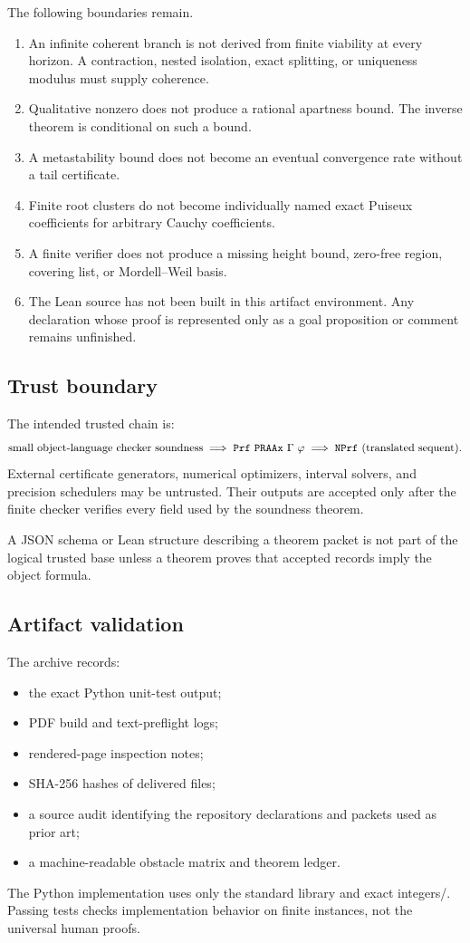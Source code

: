 The following boundaries remain.

\begin{enumerate}[label=\arabic*.]
\item An infinite coherent branch is not derived from finite viability at every horizon.  A contraction, nested isolation, exact splitting, or uniqueness modulus must supply coherence.
\item Qualitative nonzero does not produce a rational apartness bound.  The inverse theorem is conditional on such a bound.
\item A metastability bound does not become an eventual convergence rate without a tail certificate.
\item Finite root clusters do not become individually named exact Puiseux coefficients for arbitrary Cauchy coefficients.
\item A finite verifier does not produce a missing height bound, zero-free region, covering list, or Mordell--Weil basis.
\item The Lean source has not been built in this artifact environment.  Any declaration whose proof is represented only as a goal proposition or comment remains unfinished.
\end{enumerate}

\subsection{Trust boundary}

The intended trusted chain is:
\[
 \text{small object-language checker soundness}
 \;\Longrightarrow\;
 \texttt{Prf}\ \texttt{PRAAx}\ \Gamma\ \varphi
 \;\Longrightarrow\;
 \texttt{NPrf}\ (\text{translated sequent}).
\]
External certificate generators, numerical optimizers, interval solvers, and precision schedulers may be untrusted.  Their outputs are accepted only after the finite checker verifies every field used by the soundness theorem.

A JSON schema or Lean structure describing a theorem packet is not part of the logical trusted base unless a theorem proves that accepted records imply the object formula.

\subsection{Artifact validation}

The archive records:
\begin{itemize}
\item the exact Python unit-test output;
\item PDF build and text-preflight logs;
\item rendered-page inspection notes;
\item SHA-256 hashes of delivered files;
\item a source audit identifying the repository declarations and packets used as prior art;
\item a machine-readable obstacle matrix and theorem ledger.
\end{itemize}
The Python implementation uses only the standard library and exact integers/.  Passing tests checks implementation behavior on finite instances, not the universal human proofs.
